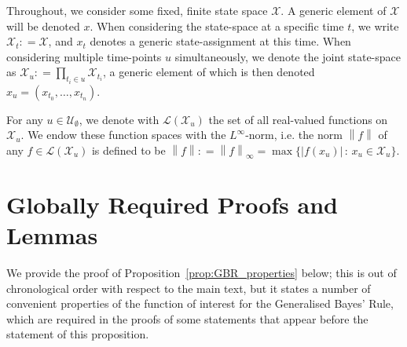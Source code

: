 \documentclass[twoside,11pt]{article}
\newcommand{\states}{\mathcal{X}}
\newcommand{\gambles}{\mathcal{L}}
\newcommand{\norm}[1]{\left\lVert #1 \right\rVert}
\newcommand{\abs}[1]{\left\vert #1 \right\vert}
\newcommand{\coloneqq}{:\!=}
\begin{document}
Throughout, we consider some fixed, finite state space $\states$. A generic element of $\states$ will be denoted $x$. When considering the state-space at a specific time $t$, we write $\states_t\coloneqq\states$, and $x_t$ denotes a generic state-assignment at this time. When considering multiple time-points $u$ simultaneously, we denote the joint state-space as $\states_u\coloneqq\prod_{t_i\in u}\states_{t_i}$, a generic element of which is then denoted $x_u=(x_{t_0},\ldots,x_{t_n})$.

For any $u\in\mathcal{U}_\emptyset$, we denote with $\gambles(\states_u)$ the set of all real-valued functions on $\states_u$. We endow these function spaces with the $L^\infty$-norm, i.e. the norm $\norm{f}$ of any $f\in\gambles(\states_u)$ is defined to be $\norm{f}\coloneqq\norm{f}_\infty=\max\{\abs{f(x_u)}\,:\,x_u\in\states_u\}$.

\section{Globally Required Proofs and Lemmas}

We provide the proof of Proposition~\ref{prop:GBR_properties} below; this is out of chronological order with respect to the main text, but it states a number of convenient properties of the function of interest for the Generalised Bayes' Rule, which are required in the proofs of some statements that appear before the statement of this proposition.
\end{document}
